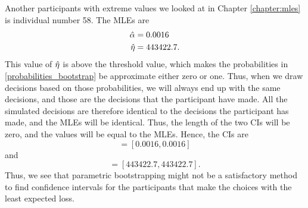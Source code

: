 Another participants with extreme values we looked at in Chapter \ref{chapter:mles} is individual number 58. The MLEs are 
\begin{equation*}
    \begin{aligned}
        \hat{\alpha} &= 0.0016\\
        \hat{\eta} &= 443422.7.
    \end{aligned}
\end{equation*}
This value of $\hat{\eta}$ is above the threshold value, which makes the probabilities in \eqref{probabilities_bootstrap} be approximate either zero or one. Thus, when we draw decisions based on those probabilities, we will always end up with the same decisions, and those are the decisions that the participant have made. All the simulated decisions are therefore identical to the decisions the participant has made, and the MLEs will be identical. Thus, the length of the two CIs will be zero, and the values will be equal to the MLEs. Hence, the CIs are
\begin{equation*}
    [\hat{\alpha}^{*(5)}_{1000},\hat{\alpha}^{*(95)}_{1000}] = [0.0016,0.0016]
\end{equation*}
and
\begin{equation*}
    [\hat{\eta}^{*(5)}_{1000},\hat{\eta}^{*(95)}_{1000}] = [443422.7,443422.7].
\end{equation*}
Thus, we see that parametric bootstrapping might not be a satisfactory method to find confidence intervals for the participants that make the choices with the least expected loss. 





